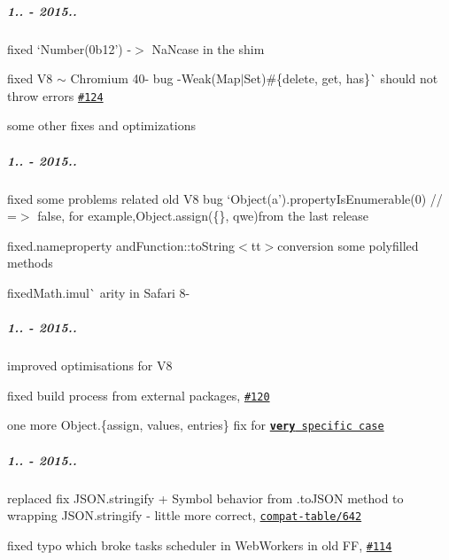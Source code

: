 \subparagraph*{1.. -\/ 2015..}


\begin{DoxyItemize}
\item fixed `Number(\textquotesingle{}0b12') -\/$>$ NaN{\ttfamily case in the shim}
\item {\ttfamily fixed V8 $\sim$ Chromium 40-\/ bug -\/}Weak(Map$\vert$\+Set)\#\{delete, get, has\}\`{} should not throw errors \href{https://github.com/zloirock/core-js/issues/124}{\tt \#124}
\item some other fixes and optimizations
\end{DoxyItemize}

\subparagraph*{1.. -\/ 2015..}


\begin{DoxyItemize}
\item fixed some problems related old V8 bug `Object(\textquotesingle{}a').property\+Is\+Enumerable(0) // =$>$ false{\ttfamily , for example,}Object.\+assign(\{\}, \textquotesingle{}qwe\textquotesingle{}){\ttfamily from the last release}
\item {\ttfamily fixed}.name{\ttfamily property and}Function\+::to\+String$<$tt$>$conversion some polyfilled methods
\item fixedMath.\+imul\`{} arity in Safari 8-\/
\end{DoxyItemize}

\subparagraph*{1.. -\/ 2015..}


\begin{DoxyItemize}
\item improved optimisations for V8
\item fixed build process from external packages, \href{https://github.com/zloirock/core-js/pull/120}{\tt \#120}
\item one more {\ttfamily Object.\{assign, values, entries\}} fix for \href{https://github.com/ljharb/proposal-object-values-entries/issues/5}{\tt {\bfseries very} specific case}
\end{DoxyItemize}

\subparagraph*{1.. -\/ 2015..}


\begin{DoxyItemize}
\item replaced fix {\ttfamily J\+S\+O\+N.\+stringify} + {\ttfamily Symbol} behavior from {\ttfamily .to\+J\+S\+ON} method to wrapping {\ttfamily J\+S\+O\+N.\+stringify} -\/ little more correct, \href{https://github.com/kangax/compat-table/pull/642}{\tt compat-\/table/642}
\item fixed typo which broke tasks scheduler in Web\+Workers in old FF, \href{https://github.com/zloirock/core-js/pull/114}{\tt \#114}
\end{DoxyItemize}

